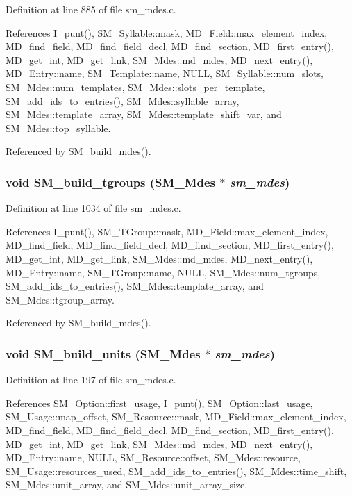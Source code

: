 Definition at line 885 of file sm\_\-mdes.c.

References I\_\-punt(), SM\_\-Syllable::mask, MD\_\-Field::max\_\-element\_\-index, MD\_\-find\_\-field, MD\_\-find\_\-field\_\-decl, MD\_\-find\_\-section, MD\_\-first\_\-entry(), MD\_\-get\_\-int, MD\_\-get\_\-link, SM\_\-Mdes::md\_\-mdes, MD\_\-next\_\-entry(), MD\_\-Entry::name, SM\_\-Template::name, NULL, SM\_\-Syllable::num\_\-slots, SM\_\-Mdes::num\_\-templates, SM\_\-Mdes::slots\_\-per\_\-template, SM\_\-add\_\-ids\_\-to\_\-entries(), SM\_\-Mdes::syllable\_\-array, SM\_\-Mdes::template\_\-array, SM\_\-Mdes::template\_\-shift\_\-var, and SM\_\-Mdes::top\_\-syllable.

Referenced by SM\_\-build\_\-mdes().
\subsubsection{\setlength{\rightskip}{0pt plus 5cm}void SM\_\-build\_\-tgroups (\bf{SM\_\-Mdes} $\ast$ {\em sm\_\-mdes})}\label{sm__mdes_8c_a1682008dc69596b9e2e654bb4128dec}




Definition at line 1034 of file sm\_\-mdes.c.

References I\_\-punt(), SM\_\-TGroup::mask, MD\_\-Field::max\_\-element\_\-index, MD\_\-find\_\-field, MD\_\-find\_\-field\_\-decl, MD\_\-find\_\-section, MD\_\-first\_\-entry(), MD\_\-get\_\-int, MD\_\-get\_\-link, SM\_\-Mdes::md\_\-mdes, MD\_\-next\_\-entry(), MD\_\-Entry::name, SM\_\-TGroup::name, NULL, SM\_\-Mdes::num\_\-tgroups, SM\_\-add\_\-ids\_\-to\_\-entries(), SM\_\-Mdes::template\_\-array, and SM\_\-Mdes::tgroup\_\-array.

Referenced by SM\_\-build\_\-mdes().
\subsubsection{\setlength{\rightskip}{0pt plus 5cm}void SM\_\-build\_\-units (\bf{SM\_\-Mdes} $\ast$ {\em sm\_\-mdes})}\label{sm__mdes_8c_57d959519b4d05185a589791c33d1dbc}




Definition at line 197 of file sm\_\-mdes.c.

References SM\_\-Option::first\_\-usage, I\_\-punt(), SM\_\-Option::last\_\-usage, SM\_\-Usage::map\_\-offset, SM\_\-Resource::mask, MD\_\-Field::max\_\-element\_\-index, MD\_\-find\_\-field, MD\_\-find\_\-field\_\-decl, MD\_\-find\_\-section, MD\_\-first\_\-entry(), MD\_\-get\_\-int, MD\_\-get\_\-link, SM\_\-Mdes::md\_\-mdes, MD\_\-next\_\-entry(), MD\_\-Entry::name, NULL, SM\_\-Resource::offset, SM\_\-Mdes::resource, SM\_\-Usage::resources\_\-used, SM\_\-add\_\-ids\_\-to\_\-entries(), SM\_\-Mdes::time\_\-shift, SM\_\-Mdes::unit\_\-array, and SM\_\-Mdes::unit\_\-array\_\-size.

